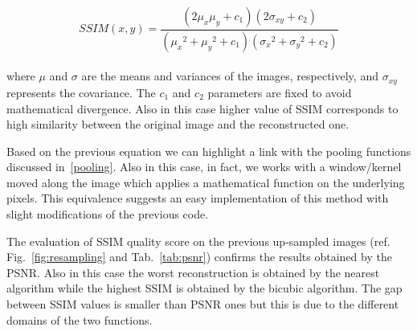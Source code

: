 \documentclass{standalone}
\begin{document}
$$
SSIM(x, y) = \frac{(2\mu_x\mu_y + c_1)(2\sigma_{xy} + c_2)}{ ({\mu_x}^2 + {\mu_y}^2 + c_1)({\sigma_x}^2 + {\sigma_y}^2 + c_2) }
$$
\\
where $\mu$ and $\sigma$ are the means and variances of the images, respectively, and $\sigma_{xy}$ represents the covariance.
The $c_1$ and $c_2$ parameters are fixed to avoid mathematical divergence.
Also in this case higher value of SSIM corresponds to high similarity between the original image and the reconstructed one.

Based on the previous equation we can highlight a link with the pooling functions discussed in~\ref{pooling}.
Also in this case, in fact, we works with a window/kernel moved along the image which applies a mathematical function on the underlying pixels.
This equivalence suggests an easy implementation of this method with slight modifications of the previous code.

The evaluation of SSIM quality score on the previous up-sampled images (ref. Fig.~\ref{fig:resampling} and Tab.~\ref{tab:psnr}) confirms the results obtained by the PSNR.
Also in this case the worst reconstruction is obtained by the nearest algorithm while the highest SSIM is obtained by the bicubic algorithm.
The gap between SSIM values is smaller than PSNR ones but this is due to the different domains of the two functions.
\end{document}
